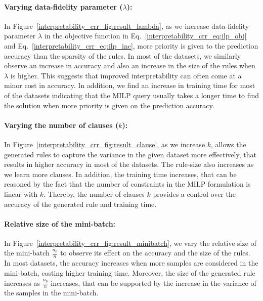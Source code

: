 	\paragraph{Varying data-fidelity parameter ($ \lambda $):} In Figure~\ref{interpretability_crr_fig:result_lambda}, as we increase data-fidelity parameter $ \lambda $ in the objective function in Eq.~\ref{interpretability_crr_eq:ilp_obj} and Eq.~\ref{interpretability_crr_eq:ilp_inc}, more priority is given to the prediction accuracy than the sparsity of the rules.  In most of the datasets, we similarly observe an increase in accuracy  and also an increase in the size of the rules when $ \lambda $ is higher. This suggests that improved interpretability can often come at a  minor cost in accuracy.  In addition, we  find an increase in training time for most of the datasets indicating that the MILP query usually takes a longer time to find the solution when more priority is given on the prediction accuracy.  
	

	
	\paragraph{Varying the number of clauses ($ k $): }
	In Figure~\ref{interpretability_crr_fig:result_clause}, as we increase  $ k $, {\crr} allows the generated rules to capture the variance in the given dataset more effectively, that results in higher  accuracy in most of the datasets. The  rule-size also increases as we learn more clauses. In addition, the training time  increases, that can be reasoned by the fact that the number of constraints in the MILP formulation is linear with $ k $. Thereby, the number of clauses $ k $ provides a control over the accuracy of the generated rule and training time. 
	 
	 
	 
	\paragraph{Relative size of the mini-batch:} In Figure~\ref{interpretability_crr_fig:result_minibatch}, we vary the relative size of the mini-batch $ \frac{n_p}{n} $ to observe its effect on the accuracy and the size of the rules. In most datasets,  the accuracy increases when more samples are considered in the mini-batch, costing higher   training time.  Moreover, the size of the generated rule increases as $ \frac{n_p}{n} $ increases, that can be supported by the increase  in the variance of the samples in the mini-batch.
	

